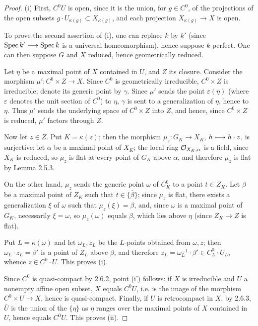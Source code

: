 \begin{proof}
(i) First, $C^0U$ is open, since it is the union, for $g\in C^0$, of the projections of the open subsets $g\cdot U_{\kappa(g)}\subset X_{\kappa(g)}$, and each projection $X_{\kappa(g)}\to X$ is open.

To prove the second assertion of (i), one can replace $k$ by $k'$ (since $\operatorname{Spec} k'\longrightarrow\operatorname{Spec} k$ is a universal homeomorphism), hence suppose $k$ perfect. One can then suppose $G$ and $X$ reduced, hence geometrically reduced.

Let $\eta$ be a maximal point of $X$ contained in $U$, and $Z$ its closure. Consider the morphism $\mu':C^0\times Z\to X$. Since $C^0$ is geometrically irreducible, $C^0\times Z$ is irreducible; denote its generic point by $\gamma$. Since $\mu'$ sends the point $\varepsilon(\eta)$ (where $\varepsilon$ denotes the unit section of $C^0$) to $\eta$, $\gamma$ is sent to a generalization of $\eta$, hence to $\eta$. Thus $\mu'$ sends the underlying space of $C^0\times Z$ into $Z$, and hence, since $C^0\times Z$ is reduced, $\mu'$ factors through $Z$.

Now let $z\in Z$. Put $K=\kappa(z)$; then the morphism $\mu_z:G_K\to X_K$, $h\longmapsto h\cdot z$, is surjective; let $\alpha$ be a maximal point of $X_K$; the local ring $\mathcal{O}_{X_K,\alpha}$ is a field, since $X_K$ is reduced, so $\mu_z$ is flat at every point of $G_K$ above $\alpha$, and therefore $\mu_z$ is flat by Lemma 2.5.3.

On the other hand, $\mu_z$ sends the generic point $\omega$ of $C^0_K$ to a point $t\in Z_K$. Let $\beta$ be a maximal point of $Z_K$ such that $t\in\overline{\{\beta\}}$; since $\mu_z$ is flat, there exists a generalization $\xi$ of $\omega$ such that $\mu_z(\xi)=\beta$, and, since $\omega$ is a maximal point of $G_K$, necessarily $\xi=\omega$, so $\mu_z(\omega)$ equals $\beta$, which lies above $\eta$ (since $Z_K\to Z$ is flat).

Put $L=\kappa(\omega)$ and let $\omega_L,z_L$ be the $L$-points obtained from $\omega,z$; then $\omega_L\cdot z_L=\beta'$ is a point of $Z_L$ above $\beta$, and therefore $z_L=\omega_L^{-1}\cdot\beta'\in C^0_L\cdot U_L$, whence $z\in C^0\cdot U$. This proves (i).

Since $C^0$ is quasi-compact by 2.6.2, point (i') follows: if $X$ is irreducible and $U$ a nonempty affine open subset, $X$ equals $C^0U$, i.e. is the image of the morphism $C^0\times U\to X$, hence is quasi-compact. Finally, if $U$ is retrocompact in $X$, by 2.6.3, $\overline U$ is the union of the $\overline{\{\eta\}}$ as $\eta$ ranges over the maximal points of $X$ contained in $U$, hence equals $C^0U$. This proves (ii).
\end{proof}
